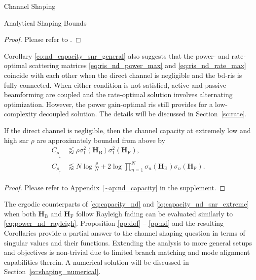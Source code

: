 \documentclass[journal]{IEEEtran}
\begin{document}
\begin{section}{Channel Shaping}
\begin{subsection}{Analytical Shaping Bounds}
		\begin{proof}
			Please refer to \cite[Appendix~A]{Bartoli2023}.
		\end{proof}

		Corollary \ref{co:nd_capacity_snr_general} also suggests that the power- and rate-optimal scattering matrices \eqref{eq:ris_nd_power_max} and \eqref{eq:ris_nd_rate_max} coincide with each other when the direct channel is negligible and the \gls{bd}-\gls{ris} is fully-connected.
		When either condition is not satisfied, active and passive beamforming are coupled and the rate-optimal solution involves alternating optimization.
		However, the power gain-optimal \gls{ris} still provides for a low-complexity decoupled solution.
		The details will be discussed in Section~\ref{sc:rate}.

		\begin{corollary}
			\label{co:nd_capacity_snr_extreme}
			If the direct channel is negligible, then the channel capacity at extremely low and high \gls{snr} $\rho$ are approximately bounded from above by
			\begin{subequations}
				\label{iq:capacity_nd_snr_extreme}
				\begin{align}
					C_{\rho_\downarrow} & \lessapprox \rho \sigma_1^2(\mathbf{H}_\mathrm{B}) \sigma_1^2(\mathbf{H}_\mathrm{F}), \label{iq:capacity_nd_snr_low}                                           \\
					C_{\rho_\uparrow}   & \lessapprox N \log \frac{\rho}{N} + 2 \log \prod_{n=1}^N \sigma_n(\mathbf{H}_\mathrm{B}) \sigma_n(\mathbf{H}_\mathrm{F}). \label{iq:capacity_nd_snr_high}
				\end{align}
			\end{subequations}
		\end{corollary}

		\begin{proof}
			Please refer to Appendix~\ref{~ap:nd_capacity} in the supplement.
		\end{proof}

		The ergodic counterparts of \eqref{eq:capacity_nd} and \eqref{iq:capacity_nd_snr_extreme} when both $\mathbf{H}_\mathrm{B}$ and $\mathbf{H}_\mathrm{F}$ follow Rayleigh fading can be evaluated similarly to \eqref{eq:power_nd_rayleigh}.
		Proposition \ref{pp:dof} -- \ref{pp:nd} and the resulting Corollaries provide a partial answer to the channel shaping question in terms of singular values and their functions.
		Extending the analysis to more general setups and objectives is non-trivial due to limited branch matching and mode alignment capabilities therein.
		A numerical solution will be discussed in Section~\ref{sc:shaping_numerical}.
	\end{subsection}


\end{section}
\end{document}
